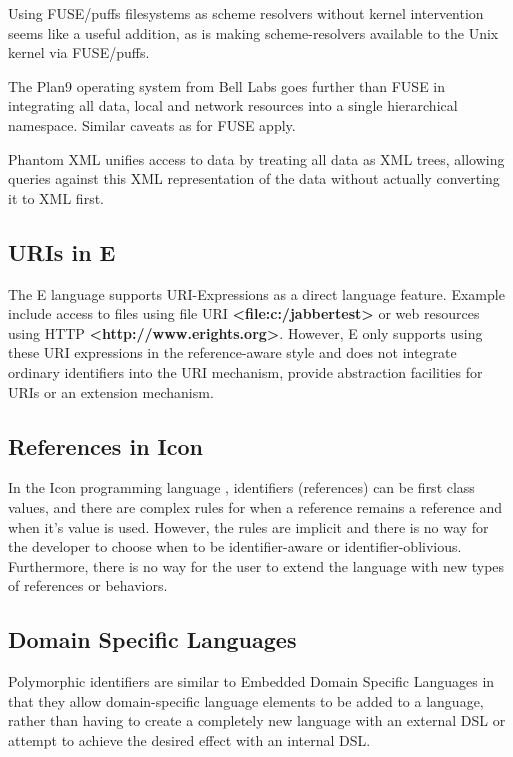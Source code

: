 \documentclass[preprint,authoryear]{acm_proc_article-sp}
\begin{document}
Using FUSE/puffs filesystems as scheme resolvers without kernel intervention seems
like a useful addition, as is making scheme-resolvers available to the Unix kernel
via FUSE/puffs.

The Plan9\cite{plan9names}\cite{plan9network} operating system from Bell Labs goes further than FUSE in integrating
all data, local and network resources into a single hierarchical namespace.  Similar
caveats as for FUSE apply.

Phantom XML\cite{phantomxml} unifies access to data by treating all data as
XML trees, allowing queries against this XML representation of the data without
actually converting it to XML first.  




\subsection{URIs in E}

The E language\cite{MillerRobustComposition}  supports URI-Expressions as a
direct language feature.  Example include access to files
using file URI  {\bf <file:c:/jabbertest>} or web resources using HTTP {\bf <http://www.erights.org>}.  However,
E only supports using these URI expressions in the reference-aware style and does not integrate 
ordinary identifiers into the URI mechanism, provide abstraction facilities 
for URIs or an extension mechanism. 


\subsection{References in Icon}

In the Icon programming language \cite{IconRef} , identifiers (references) can be first class values,
and there are complex rules for when a reference remains a reference and when
it's value is used.  However, the rules are implicit and there is no way for the 
developer to choose when to be identifier-aware or identifier-oblivious.  Furthermore,
there is no way for the user to extend the language with new types of references 
or behaviors.



\subsection{Domain Specific Languages}

Polymorphic identifiers are similar to Embedded Domain Specific Languages\cite{edsl}
in that they allow domain-specific language elements to be added to a language, rather
than having to create a completely new language with an external DSL or attempt to 
achieve the desired effect with an internal DSL\cite{fowlerdsl}.  
\end{document}
